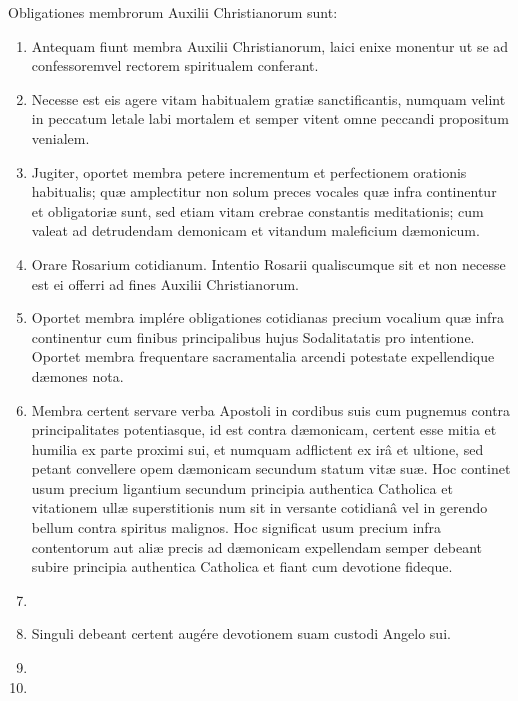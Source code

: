 \documentclass[9pt, twoside]{book}
\begin{document}
Obligationes membrorum Auxilii Christianorum sunt:
\begin{enumerate}
    \item Antequam fiunt membra Auxilii Christianorum, laici enixe monentur ut se ad confessoremvel rectorem spiritualem conferant.
    \item Necesse est eis agere vitam habitualem gratiæ sanctificantis, numquam velint in peccatum letale labi mortalem et semper vitent omne peccandi propositum venialem.
    \item Jugiter, oportet membra petere incrementum et perfectionem orationis habitualis; quæ amplectitur non solum preces vocales quæ infra continentur et obligatoriæ sunt, sed etiam vitam crebrae constantis meditationis; cum valeat ad detrudendam demonicam et vitandum maleficium dæmonicum.
    \item Orare Rosarium cotidianum. Intentio Rosarii qualiscumque sit et non necesse est ei offerri ad fines Auxilii Christianorum.
    \item Oportet membra implére obligationes cotidianas precium vocalium quæ infra continentur cum finibus principalibus hujus Sodalitatatis pro intentione. Oportet membra frequentare sacramentalia arcendi potestate expellendique dæmones nota.
    \item Membra certent servare verba Apostoli in cordibus suis cum pugnemus contra principalitates potentiasque, id est contra dæmonicam, certent esse mitia et humilia ex parte proximi sui, et numquam adflictent ex irâ et ultione, sed petant convellere opem dæmonicam secundum statum vitæ suæ. Hoc continet usum precium ligantium secundum principia authentica Catholica et vitationem ullæ superstitionis num sit in versante cotidianâ vel in gerendo bellum contra spiritus malignos. Hoc significat usum precium infra contentorum aut aliæ precis ad dæmonicam expellendam semper debeant subire principia authentica Catholica et fiant cum devotione fideque.
    \item {}
    \item Singuli debeant certent augére devotionem suam custodi Angelo sui.
    \item {}
    \item {}
\end{enumerate}
\end{document}
